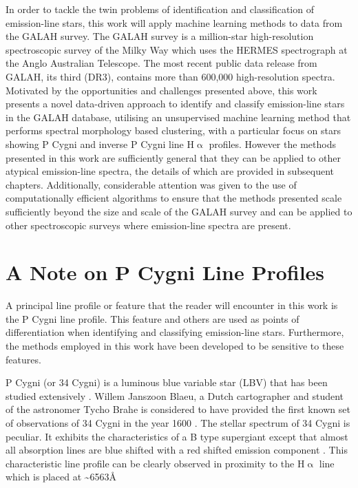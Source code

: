 In order to tackle the twin problems of identification and classification of emission-line stars, this work will apply machine learning methods to data from the GALAH survey\cite{buder2021galah+}. The GALAH survey is a million-star high-resolution spectroscopic survey of the Milky Way which uses the HERMES spectrograph at the Anglo Australian Telescope\cite{de2015galah}. The most recent public data release from GALAH, its third (DR3), contains more than 600,000 high-resolution spectra. Motivated by the opportunities and challenges presented above, this work presents a novel data-driven approach to identify and classify emission-line stars in the GALAH database, utilising an unsupervised machine learning method that performs spectral morphology based clustering, with a particular focus on stars showing P Cygni and inverse P Cygni line H$\upalpha$ profiles. However the methods presented in this work are sufficiently general that they can be applied to other atypical emission-line spectra, the details of which are provided in subsequent chapters. Additionally, considerable attention was given to the use of computationally efficient algorithms to ensure that the methods presented scale sufficiently beyond the size and scale of the GALAH survey and can be applied to other spectroscopic surveys where emission-line spectra are present. 

\section{A Note on P Cygni Line Profiles}

A principal line profile or feature that the reader will encounter in this work is the P Cygni line profile. This feature and others are used as points of differentiation when identifying and classifying emission-line stars. Furthermore, the methods employed in this work have been developed to be sensitive to these features.

P Cygni (or 34 Cygni) is a luminous blue variable star (LBV) that has been studied extensively \cite{1953PDAO....9....1B}\cite{hutchings1969expanding}\cite{elliott20225}\cite{underhill1966supergiants}\cite{mizumoto2018newly}. Willem Janszoon Blaeu, a Dutch cartographer and student of the astronomer Tycho Brahe is considered to have provided the first known set of observations of 34 Cygni in the year 1600 \cite{deGrootPCygni}. The stellar spectrum of 34 Cygni is peculiar. It exhibits the characteristics of a B type supergiant except that almost all absorption lines are blue shifted with a red shifted emission component \cite{hutchings1969expanding}. This characteristic line profile can be clearly observed in proximity to the H$\upalpha$ line which is placed at \textasciitilde 6563\r{A}\cite{zhang2021catalog}\cite{traven2015gaia}

